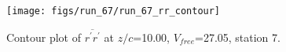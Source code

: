\begin{figure}[H]
\centering
\texttt{[image: figs/run\_67/run\_67\_rr\_contour]}
\caption{Contour plot of $\overline{r^\prime r^\prime}$ at $z/c$=10.00, $V_{free}$=27.05, station 7.}
\label{fig:run_67_rr_contour}
\end{figure}


